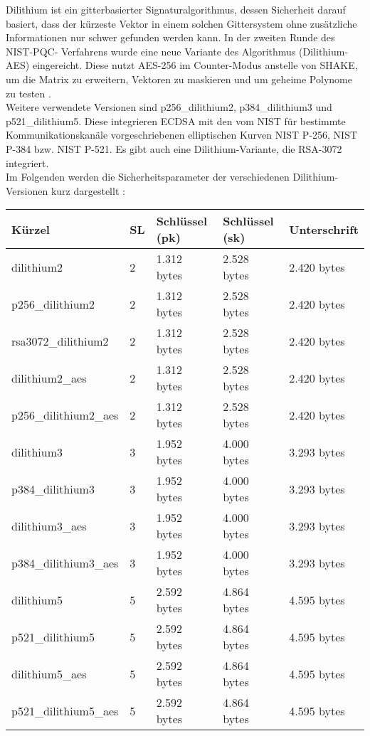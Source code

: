 		Dilithium ist ein gitterbasierter Signaturalgorithmus, dessen Sicherheit darauf basiert, dass der kürzeste Vektor in einem 				solchen Gittersystem ohne zusätzliche Informationen nur schwer gefunden werden kann. In der zweiten Runde des NIST-PQC-				Verfahrens wurde eine neue Variante des Algorithmus (Dilithium-AES) eingereicht. Diese nutzt AES-256 im Counter-Modus anstelle 		von SHAKE, um die Matrix zu erweitern, Vektoren zu maskieren und um geheime Polynome zu testen \cite{Dilithium-HP}.\\
		
		Weitere verwendete Versionen sind p256\_dilithium2, p384\_dilithium3 und p521\_dilithium5. Diese integrieren ECDSA mit den vom 		NIST für bestimmte Kommunikationskanäle vorgeschriebenen elliptischen Kurven NIST P-256, NIST P-384 \cite{Bernstein} bzw. NIST 		P-521. Es gibt auch eine Dilithium-Variante, die RSA-3072 integriert.\\
		
		Im Folgenden werden die Sicherheitsparameter der verschiedenen Dilithium-Versionen kurz dargestellt \cite{OQS-Dilithium}:		
		
		\begin{center}
			\begin{tabular}{|l|l|l|l|l|}
				\hline	
				Kürzel 					& SL 	& Schlüssel (pk) 	& Schlüssel (sk) 	& Unterschrift 	\\
				\hline
				dilithium2 				& 2 		& 1.312 bytes 		& 2.528 bytes		& 2.420 bytes	\\
				p256\_dilithium2			& 2 		& 1.312 bytes  		& 2.528 bytes		& 2.420 bytes	\\
				rsa3072\_dilithium2		& 2 		& 1.312 bytes  		& 2.528 bytes		& 2.420 bytes	\\
				dilithium2\_aes 			& 2 		& 1.312 bytes 		& 2.528 bytes		& 2.420 bytes	\\
				p256\_dilithium2\_aes	& 2 		& 1.312 bytes 		& 2.528 bytes		& 2.420 bytes	\\
				\hline
				dilithium3 				& 3 		& 1.952 bytes 		& 4.000 bytes		& 3.293 bytes	\\
				p384\_dilithium3			& 3 		& 1.952 bytes 		& 4.000 bytes		& 3.293 bytes	\\
				dilithium3\_aes 			& 3 		& 1.952 bytes 		& 4.000 bytes		& 3.293 bytes	\\
				p384\_dilithium3\_aes	& 3 		& 1.952 bytes 		& 4.000 bytes		& 3.293 bytes	\\
				\hline
				dilithium5 				& 5 		& 2.592 bytes 		& 4.864 bytes		& 4.595 bytes	\\
				p521\_dilithium5			& 5 		& 2.592 bytes 		& 4.864 bytes		& 4.595 bytes	\\
				dilithium5\_aes 			& 5 		& 2.592 bytes 		& 4.864 bytes		& 4.595 bytes	\\
				p521\_dilithium5\_aes	& 5 		& 2.592 bytes 		& 4.864 bytes		& 4.595 bytes	\\
				\hline
			\end{tabular}
		\end{center}
		
